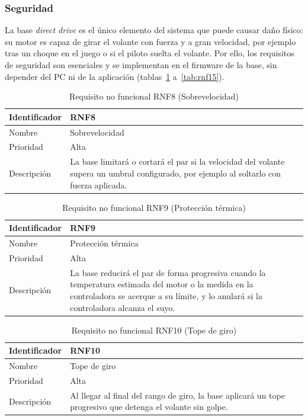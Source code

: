 \subsubsection{Seguridad}

La base \emph{direct drive} es el único elemento del sistema que puede causar daño físico: su motor es capaz de girar el volante con fuerza y a gran velocidad, por ejemplo tras un choque en el juego o si el piloto suelta el volante. Por ello, los requisitos de seguridad son esenciales y se implementan en el firmware de la base, sin depender del PC ni de la aplicación (tablas~\ref{tab:rnf8} a~\ref{tab:rnf15}).

\begin{table}[H]
	\centering
	\renewcommand{\arraystretch}{2}
	\begin{tabular}{|l|p{10cm}|}
		\hline
		Identificador & RNF8 \\
		\hline
		Nombre & Sobrevelocidad \\
		\hline
		Prioridad & Alta \\
		\hline
		Descripción & La base limitará o cortará el par si la velocidad del volante supera un umbral configurado, por ejemplo al soltarlo con fuerza aplicada. \\
		\hline
	\end{tabular}
	\caption{Requisito no funcional RNF8 (Sobrevelocidad)}
	\label{tab:rnf8}
\end{table}

\begin{table}[H]
	\centering
	\renewcommand{\arraystretch}{2}
	\begin{tabular}{|l|p{10cm}|}
		\hline
		Identificador & RNF9 \\
		\hline
		Nombre & Protección térmica \\
		\hline
		Prioridad & Alta \\
		\hline
		Descripción & La base reducirá el par de forma progresiva cuando la temperatura estimada del motor o la medida en la controladora se acerque a su límite, y lo anulará si la controladora alcanza el suyo. \\
		\hline
	\end{tabular}
	\caption{Requisito no funcional RNF9 (Protección térmica)}
	\label{tab:rnf9}
\end{table}

\begin{table}[H]
	\centering
	\renewcommand{\arraystretch}{2}
	\begin{tabular}{|l|p{10cm}|}
		\hline
		Identificador & RNF10 \\
		\hline
		Nombre & Tope de giro \\
		\hline
		Prioridad & Alta \\
		\hline
		Descripción & Al llegar al final del rango de giro, la base aplicará un tope progresivo que detenga el volante sin golpe. \\
		\hline
	\end{tabular}
	\caption{Requisito no funcional RNF10 (Tope de giro)}
	\label{tab:rnf10}
\end{table}

